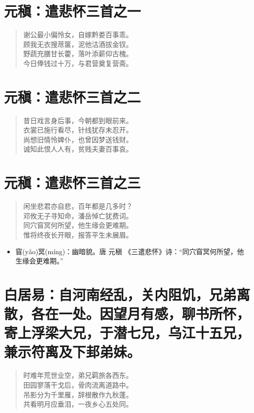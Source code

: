 \documentclass[12pt,oneside]{book}
\newenvironment{shici}{
\begin{verse}
\centering\large\hspace{12pt}}
{\end{verse}}
\begin{document}
\chapter{元稹：遣悲怀三首之一}
\begin{shici}
谢公最小偏怜女，自嫁黔娄百事乖。\\
顾我无衣搜荩箧，泥他沽酒拔金钗。\\
野蔬充膳甘长藿，落叶添薪仰古槐。\\
今日俸钱过十万，与君营奠复营斋。
\end{shici}

\chapter{元稹：遣悲怀三首之二}
\begin{shici}
昔日戏言身后事，今朝都到眼前来。\\
衣裳已施行看尽，针线犹存未忍开。\\
尚想旧情怜婢仆，也曾因梦送钱财。\\
诚知此恨人人有，贫贱夫妻百事哀。
\end{shici}

\chapter{元稹：遣悲怀三首之三}
\begin{shici}
闲坐悲君亦自悲，百年都是几多时？\\
邓攸无子寻知命，潘岳悼亡犹费词。\\
同穴窅冥何所望，他生缘会更难期。\\
惟将终夜长开眼，报答平生未展眉。
\end{shici}

\begin{itemize}
\item 窅(yǎo)冥(míng)：幽暗貌。唐 元稹 《三遣悲怀》诗：“同穴窅冥何所望，他生缘会更难期。”
\end{itemize}

\chapter{白居易：自河南经乱，关内阻饥，兄弟离散，各在一处。因望月有感，聊书所怀，寄上浮梁大兄，于潜七兄，乌江十五兄，兼示符离及下邽弟妹。}
\begin{shici}
时难年荒世业空，弟兄羁旅各西东。\\
田园寥落干戈后，骨肉流离道路中。\\
吊影分为千里雁，辞根散作九秋蓬。\\
共看明月应垂泪，一夜乡心五处同。
\end{shici}
\end{document}
